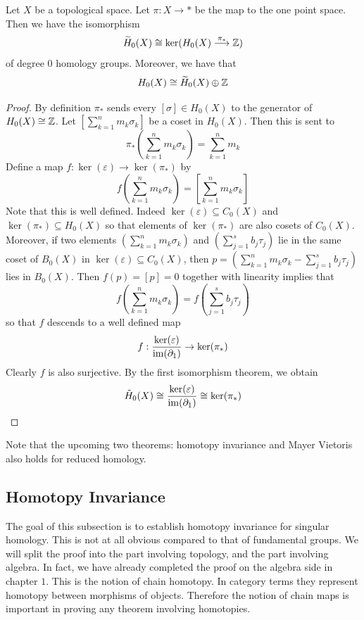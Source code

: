 \documentclass[a4paper]{article}
\begin{document}
\begin{prp}{}{} Let $X$ be a topological space. Let $\pi:X\to\ast$ be the map to the one point space. Then we have the isomorphism $$\widetilde{H}_0(X)\cong\ker(H_0(X)\overset{\pi_\ast}{\longrightarrow}\mathbb{Z})$$ of degree $0$ homology groups. Moreover, we have that $$H_0(X)\cong\widetilde{H}_0(X)\oplus\mathbb{Z}$$ \tcbline
\begin{proof}
By definition $\pi_\ast$ sends every $[\sigma]\in H_0(X)$ to the generator of $H_0(X)\cong\mathbb{Z}$. Let $\left[\sum_{k=1}^n m_k\sigma_k\right]$ be a coset in $H_0(X)$. Then this is sent to $$\pi_\ast\left(\sum_{k=1}^n m_k\sigma_k\right)=\sum_{k=1}^nm_k$$ Define a map $f:\ker(\varepsilon)\to\ker(\pi_\ast)$ by $$f\left(\sum_{k=1}^n m_k\sigma_k\right)=\left[\sum_{k=1}^n m_k\sigma_k\right]$$ Note that this is well defined. Indeed $\ker(\varepsilon)\subseteq C_0(X)$ and $\ker(\pi_\ast)\subseteq H_0(X)$ so that elements of $\ker(\pi_\ast)$ are also cosets of $C_0(X)$. Moreover, if two elements $\left(\sum_{k=1}^n m_k\sigma_k\right)$ and $\left(\sum_{j=1}^s b_j\tau_j\right)$ lie in the same coset of $B_0(X)$ in $\ker(\varepsilon)\subseteq C_0(X)$, then $p=\left(\sum_{k=1}^n m_k\sigma_k-\sum_{j=1}^s b_j\tau_j\right)$ lies in $B_0(X)$. Then $f(p)=[p]=0$ together with linearity implies that $$f\left(\sum_{k=1}^n m_k\sigma_k\right)=f\left(\sum_{j=1}^s b_j\tau_j\right)$$ so that $f$ descends to a well defined map $$f:\frac{\ker(\varepsilon)}{\operatorname{im}(\partial_1)}\to\ker(\pi_\ast)$$ Clearly $f$ is also surjective. By the first isomorphism theorem, we obtain $$\tilde{H}_0(X)\cong\frac{\ker(\varepsilon)}{\operatorname{im}(\partial_1)}\cong\ker(\pi_\ast)$$ 
\end{proof}
\end{prp}

Note that the upcoming two theorems: homotopy invariance and Mayer Vietoris also holds for reduced homology. 

\subsection{Homotopy Invariance}
The goal of this subsection is to establish homotopy invariance for singular homology. This is not at all obvious compared to that of fundamental groups. We will split the proof into the part involving topology, and the part involving algebra. In fact, we have already completed the proof on the algebra side in chapter $1$. This is the notion of chain homotopy. In category terms they represent homotopy between morphisms of objects. Therefore the notion of chain maps is important in proving any theorem involving homotopies. \\~\\
\end{document}
